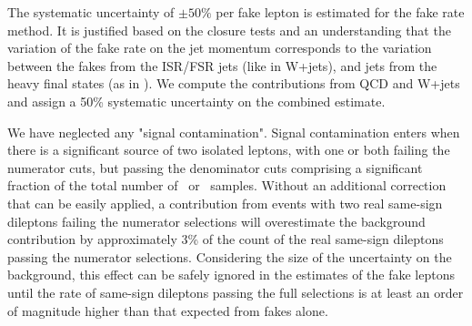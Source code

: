 %
The systematic uncertainty of $\pm 50\%$ per fake lepton is estimated for the fake rate method.
It is justified based on the closure tests and an understanding that the variation of the fake rate on
the jet momentum corresponds to the variation between the fakes from the ISR/FSR jets (like in W+jets),
and jets from the heavy final states (as in \ttbar).
We compute the contributions from QCD and W+jets and assign a 50\% systematic
uncertainty on the combined estimate.

We have neglected any "signal contamination". 
Signal contamination enters when there is a significant
source of two isolated leptons, with one or both failing the numerator cuts, but passing the denominator cuts
comprising  a significant fraction of the total number of \nNoNu\ or \nNoNo\ samples. 
Without an additional correction that can be easily applied,
a contribution from events with two real same-sign dileptons failing the numerator selections
 will overestimate the background contribution by approximately 3\% of the count of
the real same-sign dileptons passing the numerator selections.
Considering the size of the uncertainty on the background,
this effect can be safely ignored in the estimates 
of the fake leptons until the rate of same-sign dileptons passing the full
selections is at least an order of magnitude  higher than that expected
from fakes alone.



